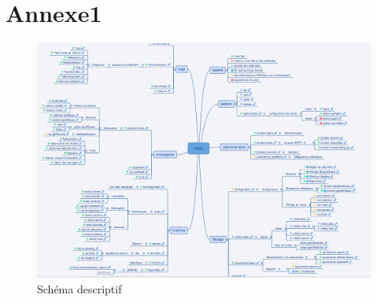 \section{Annexe1}
\begin{figure}[!h]
\begin{center}
\includegraphics[width=15cm]{./image/xmind.png}
\end{center}
\caption{Schéma descriptif}
\end{figure}